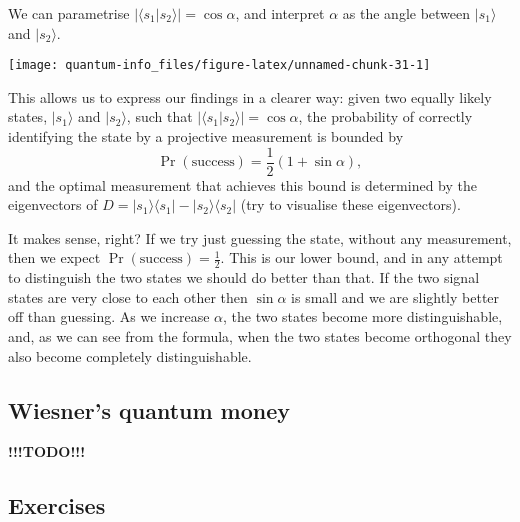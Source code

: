 \documentclass[fleqn]{article}
\begin{document}
We can parametrise \(|\langle s_1|s_2\rangle| = \cos\alpha\), and interpret \(\alpha\) as the angle between \(|s_1\rangle\) and \(|s_2\rangle\).

\begin{center}\texttt{[image: quantum-info\_files/figure-latex/unnamed-chunk-31-1]} \end{center}

This allows us to express our findings in a clearer way: given two equally likely states, \(|s_1\rangle\) and \(|s_2\rangle\), such that \(|\langle s_1|s_2\rangle| = \cos\alpha\), the probability of correctly identifying the state by a projective measurement is bounded by
\[
 \Pr (\text{success})
 = \frac12(1 + \sin\alpha),
\]
and the optimal measurement that achieves this bound is determined by the eigenvectors of \(D = |s_1\rangle\langle s_1|-|s_2\rangle\langle s_2|\) (try to visualise these eigenvectors).

It makes sense, right?
If we try just guessing the state, without any measurement, then we expect \(\Pr (\text{success}) = \frac12\).
This is our lower bound, and in any attempt to distinguish the two states we should do better than that.
If the two signal states are very close to each other then \(\sin\alpha\) is small and we are slightly better off than guessing.
As we increase \(\alpha\), the two states become more distinguishable, and, as we can see from the formula, when the two states become orthogonal they also become completely distinguishable.

\hypertarget{wiesners-quantum-money}{%
\subsection{Wiesner's quantum money}\label{wiesners-quantum-money}}

\textbf{!!!TODO!!!}

\hypertarget{exercises-5}{%
\subsection{Exercises}\label{exercises-5}}
\end{document}
